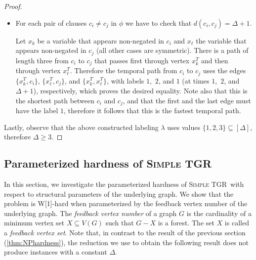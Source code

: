 \documentclass[a4paper,UKenglish,cleveref, autoref, thm-restate]{lipics-v2021}
\newcommand{\deltaExact}{\textsc{Simple TGR}}
\begin{document}
\begin{proof}
\begin{itemize}
    \item For each pair of clauses $c_i \neq c_j$ in $\phi$ we have to check that
    $d(c_i,c_j)= \Delta + 1$.

    Let $x_k$ be a variable that appears non-negated in $c_i$
    and $x_\ell$ the variable that appears non-negated in $c_j$
    (all other cases are symmetric).
    There is a path of length three from $c_i$ to $c_j$
    that passes first through vertex $x_k^T$ and then through vertex $x_\ell^T$.
    Therefore the temporal path from $c_i$ to $c_j$
    uses the edges $\{x_k^T, c_i\}$, $\{x_\ell^T, c_j\}$, and $\{x_k^T, x_\ell ^T\}$, with labels $1$,~$2$, and $1$ (at times $1$,~$2$, and $\Delta + 1$), respectively,
    which proves the desired equality.
    Note also that this is the shortest path between $c_i$ and $c_j$, and that the first and the last edge must have the label $1$,
    therefore it follows that this is the fastest temporal path.
\end{itemize}
Lastly, observe that the above constructed labeling $\lambda$ uses values $\{1,2,3\}\subseteq[\Delta]$, therefore $\Delta\ge 3$.
\end{proof}


\subsection{Parameterized hardness of \deltaExact}\label{sec:w1hardness}

In this section, we investigate the parameterized hardness of \deltaExact\ with respect to structural parameters of the underlying graph. We show that the problem is W[1]-hard when parameterized by the feedback vertex number of the underlying graph. The \emph{feedback vertex number} of a graph $G$ is the cardinality of a minimum vertex set $X\subseteq V(G)$ such that $G-X$ is a forest. The set $X$ is called a \emph{feedback vertex set}. 
Note that, in contrast to the result of the previous section (\cref{thm:NPhardness}), the reduction we use to obtain the following result does not produce instances with a constant $\Delta$.
\end{document}
